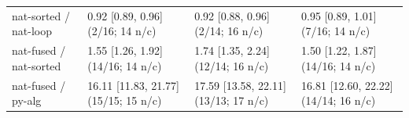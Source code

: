 \begin{table}[t]
\begin{tabular}{llll}
\textsf{nat-sorted} / \textsf{nat-loop} & 0.92 [0.89, 0.96]\,{\scriptsize(2/16; 14 n/c)} & 0.92 [0.88, 0.96]\,{\scriptsize(2/14; 16 n/c)} & 0.95 [0.89, 1.01]\,{\scriptsize(7/16; 14 n/c)} \\
\textsf{nat-fused} / \textsf{nat-sorted} & 1.55 [1.26, 1.92]\,{\scriptsize(14/16; 14 n/c)} & 1.74 [1.35, 2.24]\,{\scriptsize(12/14; 16 n/c)} & 1.50 [1.22, 1.87]\,{\scriptsize(14/16; 14 n/c)} \\
\textsf{nat-fused} / \textsf{py-alg} & 16.11 [11.83, 21.77]\,{\scriptsize(15/15; 15 n/c)} & 17.59 [13.58, 22.11]\,{\scriptsize(13/13; 17 n/c)} & 16.81 [12.60, 22.22]\,{\scriptsize(14/14; 16 n/c)} \\
\bottomrule
\end{tabular}
\end{table}

